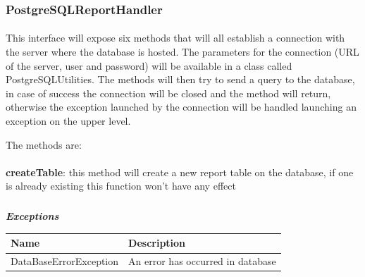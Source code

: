 				\subsubsection{PostgreSQLReportHandler}
					\paragraph{}
						This interface will expose six methods that will all establish a connection with the server where the database is hosted. The parameters for the connection (URL of the server, user and password) will be available in a class called PostgreSQLUtilities. The methods will then try to send a query to the database, in case of success the connection will be closed and the method will return, otherwise the exception launched by the connection will be handled launching an exception on the upper level.
						
						The methods are:
						
						\paragraph{}
							\textbf{createTable}: this method will create a new report table on the database, if one is already existing this function won't have any effect
							\subparagraph{}	
							\textit{\textbf{Exceptions}}
							\vspace{-2mm}
								\begin{table}[!h]
									\begin{tabular}{L{0.35\textwidth}L{0.45\textwidth}}
										\toprule
										\textbf{Name} & \textbf{Description} \\
										\midrule
								  		DataBaseErrorException & An error has occurred in database \\
								 		\bottomrule
									\end{tabular}
								\end{table}
